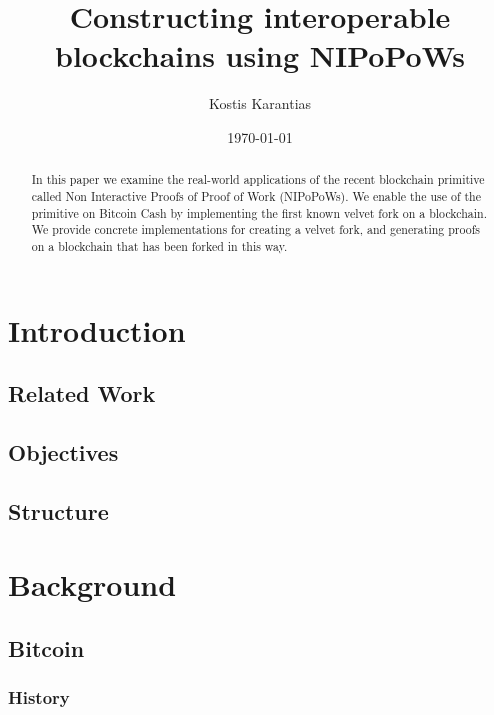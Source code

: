 \documentclass[11pt]{llncs}
\begin{document}
\title{Constructing interoperable blockchains using NIPoPoWs}
\date{\today}
\author{Kostis Karantias\\
    }
\maketitle
\noindent
\makebox[\linewidth]{\small \today}

\newpage

\begin{abstract}
  In this paper we examine the real-world applications of the recent blockchain
  primitive called Non Interactive Proofs of Proof of Work (NIPoPoWs). We
  enable the use of the primitive on Bitcoin Cash by implementing the first
  known velvet fork on a blockchain. We provide concrete implementations for
  creating a velvet fork, and generating proofs on a blockchain that has been
  forked in this way.
\end{abstract}

\newpage

\tableofcontents

\newpage

\thispagestyle{plain}

\section{Introduction}

\subsection{Related Work}
\subsection{Objectives}
\subsection{Structure}

\section{Background}

\subsection{Bitcoin}

\subsubsection{History}
\end{document}
